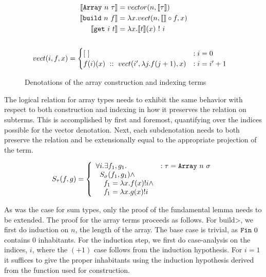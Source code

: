   \begin{figure}
    \begin{gather*}
      \begin{aligned}
      \llbracket \texttt{Array}\ n\ \tau \rrbracket &=
        vector(n, \llbracket \tau \rrbracket) \\
      \llbracket \texttt{build}\ n\ f \rrbracket &=
        \lambda x.
        vect(n, \llbracket \rrbracket \circ f, x) \\
      \llbracket \texttt{get}\ i\ t \rrbracket &=
        \lambda x. \llbracket t \rrbracket(x)\ !\ i \\
      \end{aligned}\\ \\
      \begin{aligned}
      vect(i, f, x) &=
        \begin{cases}
          [\ ]
            &: i = 0 \\
          f(i)(x)\ ::\ vect(i', \lambda j. f(j + 1), x)
            &: i = i' + 1
        \end{cases}
      \end{aligned}
    \end{gather*}
    \caption{Denotations of the array construction and indexing terms}
    \label{eqn:denotation_array}
  \end{figure}

  The logical relation for array types needs to exhibit the same behavior with respect to both construction and indexing in how it preserves the relation on subterms.
  This is accomplished by first and foremost, quantifying over the indices possible for the vector denotation.
  Next, each subdenotation needs to both preserve the relation and be extensionally equal to the appropriate projection of the term.

  \begin{equation}
    S_\tau(f, g) =
      \left\{
        \begin{array}{ll}
          \forall i. \exists f_1, g_1.
            & : \tau = \texttt{Array}\ n\ \sigma \\
          \;\;S_\sigma(f_1, g_1) \wedge \\
          \;\;\;\;f_1 = \lambda x. f(x)!i \wedge \\
          \;\;\;\;f_1 = \lambda x. g(x)!i \\
        \end{array}
      \right.
  \label{eqn:lr_array}
  \end{equation}

  As was the case for sum types, only the proof of the fundamental lemma needs to be extended.
  The proof for the array terms proceeds as follows.
  For \<build>, we first do induction on $n$, the length of the array.
  The base case is trivial, as $\texttt{Fin}\ 0$ contains $0$ inhabitants.
  For the induction step, we first do case-analysis on the indices, $i$, where the $(+1)$ case follows from the induction hypothesis.
  For $i=1$ it suffices to give the proper inhabitants using the induction hypothesis derived from the function used for construction.
